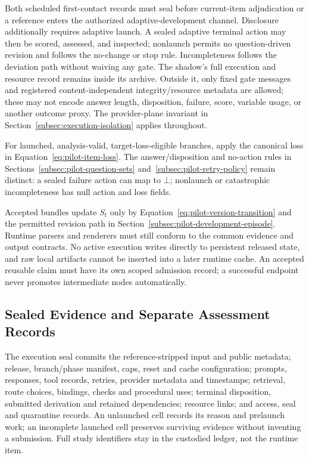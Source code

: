 \documentclass[10pt]{article} %
\providecommand{\1}{\mathbf{1}}  %
\theoremstyle{remark}
\theoremstyle{definition}
\begin{document}
Both scheduled first-contact records must seal before current-item
adjudication or a reference enters the authorized adaptive-development channel.
Disclosure additionally requires adaptive launch. A sealed adaptive terminal
action may then be scored, assessed, and inspected; nonlaunch permits no
question-driven revision and follows the no-change or stop rule. Incompleteness
follows the deviation path without waiving any gate. The shadow's full
execution and resource record remains inside its archive. Outside it, only
fixed gate messages and registered content-independent integrity/resource
metadata are allowed; these may not encode answer length, disposition,
failure, score, variable usage, or another outcome proxy. The provider-plane
invariant in Section~\ref{subsec:execution-isolation} applies throughout.

For launched, analysis-valid, target-loss-eligible branches, apply the
canonical loss in Equation~\ref{eq:pilot-item-loss}. The answer/disposition
and no-action rules in
Sections~\ref{subsec:pilot-question-sets}
and~\ref{subsec:pilot-retry-policy} remain distinct: a sealed failure action
can map to $\bot$; nonlaunch or catastrophic incompleteness has null action
and loss fields.

Accepted bundles update $S_t$ only by Equation~\ref{eq:pilot-version-transition}
and the permitted revision path in
Section~\ref{subsec:pilot-development-episode}.
Runtime parsers and renderers must still conform to the common evidence and
output contracts. No active execution writes directly to persistent released
state, and raw local artifacts cannot be inserted into a later runtime cache.
An accepted reusable claim must have its own scoped admission record; a
successful endpoint never promotes intermediate nodes automatically.

\subsection{Sealed Evidence and Separate Assessment Records}
\label{subsec:execution-evidence}

The execution seal commits the reference-stripped input and public metadata;
release, branch/phase manifest, caps, reset and cache configuration; prompts,
responses, tool records, retries, provider metadata and timestamps; retrieval,
route choices, bindings, checks and procedural uses; terminal disposition,
submitted derivation and retained dependencies; resource links; and access,
seal and quarantine records.
An unlaunched cell records its reason and prelaunch work; an incomplete
launched cell preserves surviving evidence without inventing a submission.
Full study identifiers stay in the custodied ledger, not the runtime item.
\end{document}
